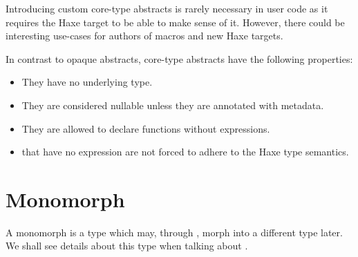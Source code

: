Introducing custom core-type abstracts is rarely necessary in user code as it requires the Haxe target to be able to make sense of it. However, there could be interesting use-cases for authors of macros and new Haxe targets.

In contrast to opaque abstracts, core-type abstracts have the following properties:

\begin{itemize}
	\item They have no underlying type.
	\item They are considered nullable unless they are annotated with  metadata.
	\item They are allowed to declare  functions without expressions.
	\item {} that have no expression are not forced to adhere to the Haxe type semantics.
\end{itemize}



\section{Monomorph}
\label{types-monomorph}

A monomorph is a type which may, through , morph into a different type later. We shall see details about this type when talking about .
